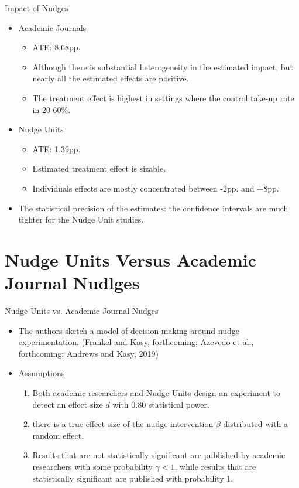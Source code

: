 \documentclass[dvipdfmx,11pt]{beamer}
\begin{document}
\begin{frame}{Impact of Nudges}
  \begin{itemize}
    \item Academic Journals 
    \begin{itemize}
      \item ATE: 8.68pp. 
      \item Although there is substantial heterogeneity in the estimated impact, but nearly all the estimated effects are positive.
      \item The treatment effect is highest in settings where the control take-up rate in 20-60\%.
    \end{itemize}
    \item Nudge Units
    \begin{itemize}
      \item ATE: 1.39pp.
      \item Estimated treatment effect is sizable.
      \item Individuals effects are mostly concentrated between -2pp. and +8pp.
    \end{itemize}
    \item The statistical precision of the estimates: the confidence intervals are much tighter for the Nudge Unit studies.
  \end{itemize}
\end{frame}

\section{Nudge Units Versus Academic Journal Nudlges}
\frame{\sectionpage}

\begin{frame}{Nudge Units vs. Academic Journal Nudges}
  \begin{itemize}
    \item The authors sketch a model of decision-making around nudge experimentation. (Frankel and Kasy, forthcoming; Azevedo et al., forthcoming; Andrews and Kasy, 2019)
    \item Assumptions
    \begin{enumerate}
      \item Both academic researchers and Nudge Units design an experiment to detect an effect size $d$ with 0.80 statistical power.
      \item there is a true effect size of the nudge intervention $\beta$ distributed with a random effect.
      \item Results that are not statistically significant are published by academic researchers with some probability $\gamma < 1$, while results that are statistically significant are published with probability 1.
    \end{enumerate}
  \end{itemize}
\end{frame}
\end{document}

